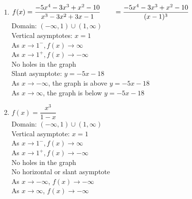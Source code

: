 \begin{multicols}{2}
\begin{enumerate}
\setcounter{enumi}{\value{HW}}

\item \small $f(x) = \dfrac{-5x^{4} - 3x^{3} + x^{2} - 10}{x^{3} - 3x^{2} + 3x - 1} \\ \phantom{f(x)} = \dfrac{-5x^{4} - 3x^{3} + x^{2} - 10}{(x-1)^3} $ \normalsize \\
Domain: $(-\infty, 1) \cup (1, \infty)$\\
Vertical asymptotes: $x = 1$\\
As $x \rightarrow 1^{-}, f(x) \rightarrow \infty$\\
As $x \rightarrow 1^{+}, f(x) \rightarrow -\infty$\\
No holes in the graph \\
Slant asymptote: $y=-5x-18$ \\
 \small  As $x \rightarrow -\infty$, the graph is above $y=-5x-18$ \normalsize\\
 \small  As $x \rightarrow \infty$, the graph is below $y=-5x-18$ \normalsize \\
 
 \vfill
 
 \columnbreak

\item $f(x) = \dfrac{x^3}{1-x}$\\
Domain: $(-\infty, 1) \cup (1, \infty)$\\
Vertical asymptote: $x=1$\\
As $x \rightarrow 1^{-}, f(x) \rightarrow \infty$\\
As $x \rightarrow 1^{+}, f(x) \rightarrow -\infty$\\
No holes in the graph \\
No horizontal or slant asymptote \\
As $x \rightarrow -\infty$, $f(x) \rightarrow -\infty$\\
As $x \rightarrow \infty$, $f(x) \rightarrow -\infty$\\


\setcounter{HW}{\value{enumi}}
\end{enumerate}
\end{multicols}

